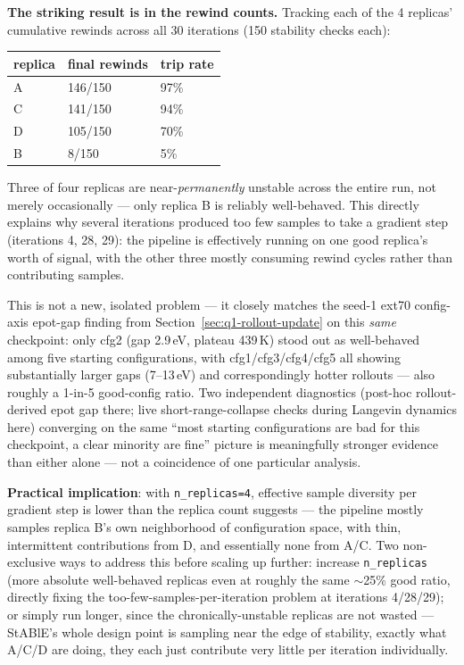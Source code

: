 \documentclass[11pt]{article}
\begin{document}
\textbf{The striking result is in the rewind counts.} Tracking each of the
4 replicas' cumulative rewinds across all 30 iterations (150 stability
checks each):

\begin{center}
\begin{tabular}{lll}
\toprule
replica & final rewinds & trip rate \\
\midrule
A & 146/150 & 97\% \\
C & 141/150 & 94\% \\
D & 105/150 & 70\% \\
B & 8/150 & 5\% \\
\bottomrule
\end{tabular}
\end{center}

Three of four replicas are near-\emph{permanently} unstable across the
entire run, not merely occasionally --- only replica B is reliably
well-behaved. This directly explains why several iterations produced too
few samples to take a gradient step (iterations 4, 28, 29): the pipeline
is effectively running on one good replica's worth of signal, with the
other three mostly consuming rewind cycles rather than contributing
samples.

This is not a new, isolated problem --- it closely matches the seed-1
ext70 config-axis epot-gap finding from Section~\ref{sec:q1-rollout-update}
on this \emph{same} checkpoint: only cfg2 (gap 2.9\,eV, plateau 439\,K)
stood out as well-behaved among five starting configurations, with
cfg1/cfg3/cfg4/cfg5 all showing substantially larger gaps (7--13\,eV) and
correspondingly hotter rollouts --- also roughly a 1-in-5 good-config
ratio. Two independent diagnostics (post-hoc rollout-derived epot gap
there; live short-range-collapse checks during Langevin dynamics here)
converging on the same ``most starting configurations are bad for this
checkpoint, a clear minority are fine'' picture is meaningfully stronger
evidence than either alone --- not a coincidence of one particular
analysis.

\textbf{Practical implication}: with \texttt{n\_replicas=4}, effective
sample diversity per gradient step is lower than the replica count
suggests --- the pipeline mostly samples replica B's own neighborhood
of configuration space, with thin, intermittent contributions from D, and
essentially none from A/C. Two non-exclusive ways to address this before
scaling up further: increase \texttt{n\_replicas} (more absolute
well-behaved replicas even at roughly the same $\sim$25\% good ratio,
directly fixing the too-few-samples-per-iteration problem at iterations
4/28/29); or simply run longer, since the chronically-unstable replicas
are not wasted --- StABlE's whole design point is sampling near the edge
of stability, exactly what A/C/D are doing, they each just contribute very
little per iteration individually.
\end{document}

